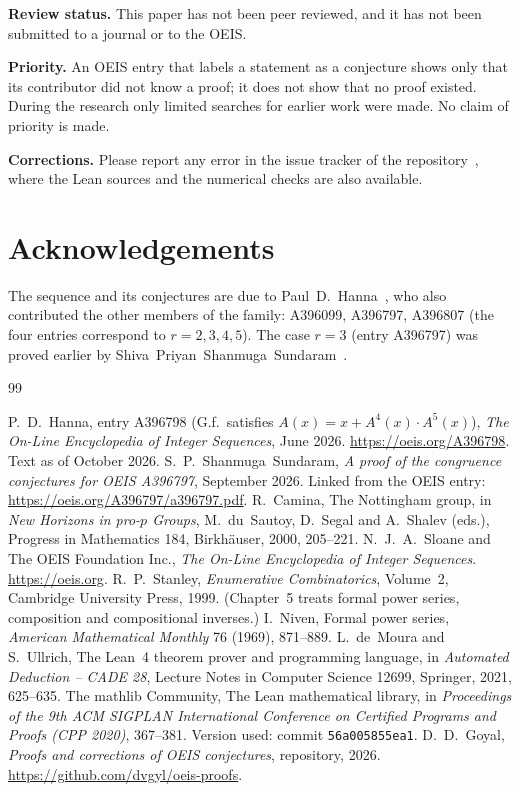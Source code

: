 \documentclass[11pt,a4paper]{article}
\theoremstyle{definition}
\theoremstyle{remark}
\newcommand{\para}[1]{\par\medskip\noindent\textbf{#1}\enspace}
\begin{document}
\para{Review status.} This paper has not been peer reviewed, and it has not been submitted to a journal or to the OEIS.

\para{Priority.} An OEIS entry that labels a statement as a conjecture shows only that its contributor did not know
a proof; it does not show that no proof existed. During the research only limited searches for earlier work were
made. No claim of priority is made.

\para{Corrections.} Please report any error in the issue tracker of the repository~\cite{repo}, where the Lean sources and the numerical checks are also
available.

\section*{Acknowledgements}
The sequence and its conjectures are due to Paul~D.~Hanna~\cite{oeis}, who also contributed the other members of the
family: A396099, A396797, A396807 (the four entries correspond to $r=2,3,4,5$). The case $r=3$ (entry A396797) was
proved earlier by Shiva~Priyan~Shanmuga~Sundaram~\cite{sundaram}. 

\begin{thebibliography}{99}\small
\raggedright
{} P.~D.~Hanna, entry A396798 (G.f.\ satisfies $A(x)=x+A^{4}(x)\cdot A^{5}(x)$), \emph{The On-Line Encyclopedia of Integer Sequences}, June 2026. \url{https://oeis.org/A396798}. Text as of October 2026.
 S.~P.~Shanmuga~Sundaram, \emph{A proof of the congruence conjectures for OEIS A396797}, September 2026. Linked from the OEIS entry: \url{https://oeis.org/A396797/a396797.pdf}.
 R.~Camina, The Nottingham group, in \emph{New Horizons in pro-$p$ Groups}, M.~du~Sautoy, D.~Segal and A.~Shalev (eds.), Progress in Mathematics 184, Birkh\"auser, 2000, 205--221.
 N.~J.~A.~Sloane and The OEIS Foundation Inc., \emph{The On-Line Encyclopedia of Integer Sequences}. \url{https://oeis.org}.
 R.~P.~Stanley, \emph{Enumerative Combinatorics}, Volume~2, Cambridge University Press, 1999. (Chapter~5 treats formal power series, composition and compositional inverses.)
 I.~Niven, Formal power series, \emph{American Mathematical Monthly} 76 (1969), 871--889.
 L.~de~Moura and S.~Ullrich, The Lean~4 theorem prover and programming language, in \emph{Automated Deduction -- CADE 28}, Lecture Notes in Computer Science 12699, Springer, 2021, 625--635.
 The mathlib Community, The Lean mathematical library, in \emph{Proceedings of the 9th ACM SIGPLAN International Conference on Certified Programs and Proofs (CPP 2020)}, 367--381. Version used: commit \texttt{56a005855ea1}.
 D.~D.~Goyal, \emph{Proofs and corrections of OEIS conjectures}, repository, 2026. \url{https://github.com/dvgyl/oeis-proofs}.
\end{thebibliography}
\end{document}
